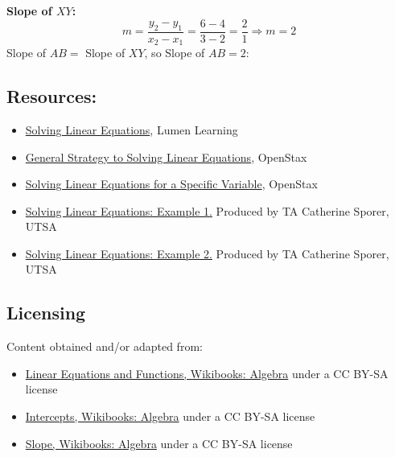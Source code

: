 \textbf{Slope of $XY$:}
\[
m = \frac{y_2 - y_1}{x_2 - x_1} = \frac{6 - 4}{3 - 2} = \frac{2}{1} \Rightarrow m = 2
\]
Slope of $AB = $ Slope of $XY$, so Slope of $AB = 2$: 
\subsection{Resources:}
\label{sss:reso-55b5}

\begin{itemize}
    \item \href{https://courses.lumenlearning.com/beginalgebra/chapter/introduction-to-solving-linear-equations/}{Solving Linear Equations}, Lumen Learning
    \item \href{https://openstax.org/books/intermediate-algebra-2e/pages/2-1-use-a-general-strategy-to-solve-linear-equations}{General Strategy to Solving Linear Equations}, OpenStax
    \item \href{https://openstax.org/books/intermediate-algebra-2e/pages/2-3-solve-a-formula-for-a-specific-variable}{Solving Linear Equations for a Specific Variable}, OpenStax
    \item \href{https://www.youtube.com/watch?v=bsGyJ0GeRy8}{Solving Linear Equations: Example 1.} Produced by TA Catherine Sporer, UTSA
    \item \href{https://www.youtube.com/watch?v=nGZcfHQEdqo}{Solving Linear Equations: Example 2.} Produced by TA Catherine Sporer, UTSA
\end{itemize}

\subsection{Licensing}
\label{sss:lice-7352}

Content obtained and/or adapted from:

\begin{itemize}
    \item \href{https://en.wikibooks.org/wiki/Algebra/Linear_Equations_and_Functions}{Linear Equations and Functions, Wikibooks: Algebra} under a CC BY-SA license
    \item \href{https://en.wikibooks.org/wiki/Algebra/Intercepts}{Intercepts, Wikibooks: Algebra} under a CC BY-SA license
    \item \href{https://en.wikibooks.org/wiki/Algebra/Slope}{Slope, Wikibooks: Algebra} under a CC BY-SA license
\end{itemize}

